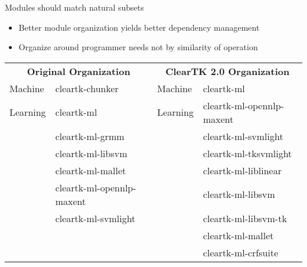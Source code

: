 \documentclass[final]{beamer}
\begin{document}
\begin{frame}[fragile]
\begin{columns}[t]
\begin{column}{.45\linewidth}
    \begin{block}{Modules should match natural subsets}
            \begin{itemize}
                    \item Better module organization yields better dependency management
                    \item Organize around programmer needs not by similarity of operation
            \end{itemize}
            {\footnotesize
                    \centering
                    \begin{tabular*}{.90\linewidth}{ll|ll}
                    \cline{1-4}
                    \cline{1-4}
                    \multicolumn{2}{c|}{\textbf{Original Organization}}  & \multicolumn{2}{c}{\textbf{ClearTK 2.0 Organization}}\\
                    \cline{1-4}
                    \cline{1-4}
                    Machine          & cleartk-chunker          & Machine          & cleartk-ml\\
                    Learning         & cleartk-ml               & Learning         & cleartk-ml-opennlp-maxent \\
                                     & cleartk-ml-grmm          &                  & cleartk-ml-svmlight \\
                                     & cleartk-ml-libsvm        &                  & cleartk-ml-tksvmlight \\
                                     & cleartk-ml-mallet        &                  & cleartk-ml-liblinear \\ 
                                     & cleartk-ml-opennlp-maxent &                 & cleartk-ml-libsvm \\
                                     & cleartk-ml-svmlight       &                 & cleartk-ml-libsvm-tk\\
                                     &                           &                 & cleartk-ml-mallet \\
                                     &                           &                 & cleartk-ml-crfsuite \\

\end{tabular*}}
\end{block}
\end{column}
\end{columns}
\end{frame}
\end{document}
